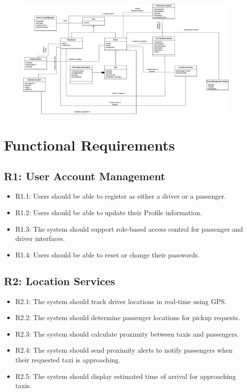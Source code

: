 \documentclass[a4paper,12pt]{article}
\begin{document}
\begin{figure}[H]
  \centering
  \includegraphics[width=1\textwidth]{Domain Model.jpg} 
\end{figure}

\section{Functional Requirements}

\subsection*{R1: User Account Management}
\begin{itemize}
    \item R1.1: Users should be able to register as either a driver or a passenger.
    \item R1.2: Users should be able to update their Profile information.
    \item R1.3: The system should support role-based access control for passenger and driver interfaces.
    \item R1.4: Users should be able to reset or change their passwords.
\end{itemize}

\subsection*{R2: Location Services}
\begin{itemize}
    \item R2.1: The system should track driver locations in real-time using GPS.
    \item R2.2: The system should determine passenger locations for pickup requests.
    \item R2.3: The system should calculate proximity between taxis and passengers.
    \item R2.4: The system should send proximity alerts to notify passengers when their requested taxi is approaching.
    \item R2.5: The system should display estimated time of arrival for approaching taxis.
\end{itemize}
\end{document}
